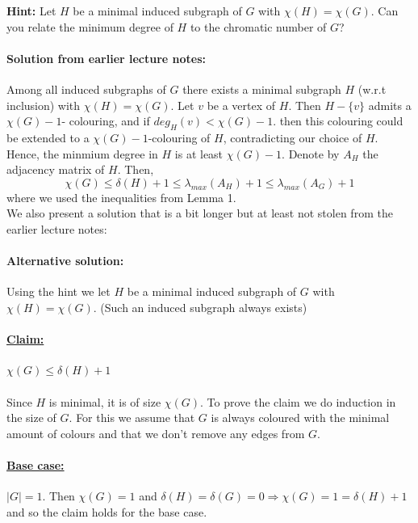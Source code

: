 \documentclass{article}
\begin{document}
  \textbf{Hint:} Let $H$ be a minimal induced subgraph of $G$ with $\chi(H) = \chi(G)$. Can you relate the minimum degree of $H$ to the chromatic number of $G$?
  
\paragraph{Solution from earlier lecture notes:} Among all induced subgraphs of $G$ there exists a minimal subgraph $H$ (w.r.t inclusion) with $\chi(H)= \chi(G)$. Let $v$ be a vertex of $H$. Then $H - \{v\}$ admits a $\chi(G) - 1$- colouring, and if $deg_{H}(v) < \chi(G) - 1$. then this colouring could be extended to a $\chi(G) - 1$-colouring of $H$, contradicting our choice of $H$. Hence, the minmium degree in $H$ is at least $\chi(G) - 1$. Denote by $A_{H}$ the adjacency matrix of $H$. Then, 
$$\chi(G) \leq \delta(H) + 1 \leq \lambda_{max}(A_{H}) + 1\leq \lambda_{max}(A_{G}) + 1$$ where we used the inequalities from Lemma 1.\\

We also present a solution that is a bit longer but at least not stolen from the earlier lecture notes:

\paragraph{Alternative solution:} Using the hint we let $H$ be a minimal induced subgraph of $G$ with $\chi(H) = \chi(G)$. (Such an induced subgraph always exists) 

\paragraph{\underline{Claim:}} $\chi(G) \leq \delta(H) + 1 $ 

\paragraph{} Since $H$ is minimal, it is of size $\chi(G)$. To prove the claim we do induction in the size of $G$. For this we assume that $G$ is always coloured with the minimal amount of colours and that we don't remove any edges from $G$. 

\paragraph{\underline{Base case:}} 
$|G|=1$. Then $\chi(G) = 1$ and $\delta(H) = \delta(G) = 0  \Rightarrow \chi(G) = 1 = \delta(H) + 1$ and so the claim holds for the base case.
\end{document}
